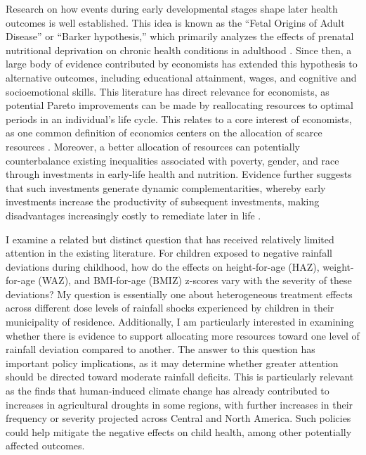 \documentclass[12pt]{article}
\begin{document}
Research on how events during early developmental stages shape later health outcomes is well established. This idea is known as the ``Fetal Origins of Adult Disease'' or ``Barker hypothesis,'' which primarily analyzes the effects of prenatal nutritional deprivation on chronic health conditions in adulthood \parencite{barkerMothersBabiesHealth1998}. Since then, a large body of evidence contributed by economists has extended this hypothesis to alternative outcomes, including educational attainment, wages, and cognitive and socioemotional skills. This literature has direct relevance for economists, as potential Pareto improvements can be made by reallocating resources to optimal periods in an individual's life cycle. This relates to a core interest of economists, as one common definition of economics centers on the allocation of scarce resources \parencite{backhouseRetrospectivesDefinitionEconomics2009}. Moreover, a better allocation of resources can potentially counterbalance existing inequalities associated with poverty, gender, and race through investments in early-life health and nutrition. Evidence further suggests that such investments generate dynamic complementarities, whereby early investments increase the productivity of subsequent investments, making disadvantages increasingly costly to remediate later in life \parencite{cunhaInterpretingEvidenceLife2006,cunhaTechnologySkillFormation2007}.

I examine a related but distinct question that has received relatively limited attention in the existing literature. For children exposed to negative rainfall deviations during childhood, how do the effects on height-for-age (HAZ), weight-for-age (WAZ), and BMI-for-age (BMIZ) z-scores vary with the severity of these deviations? My question is essentially one about heterogeneous treatment effects across different dose levels of rainfall shocks experienced by children in their municipality of residence. Additionally, I am particularly interested in examining whether there is evidence to support allocating more resources toward one level of rainfall deviation compared to another. The answer to this question has important policy implications, as it may determine whether greater attention should be directed toward moderate rainfall deficits. This is particularly relevant as the \textcite{ipccSummaryPolicymakers2021} finds that human-induced climate change has already contributed to increases in agricultural droughts in some regions, with further increases in their frequency or severity projected across Central and North America. Such policies could help mitigate the negative effects on child health, among other potentially affected outcomes.
\end{document}

